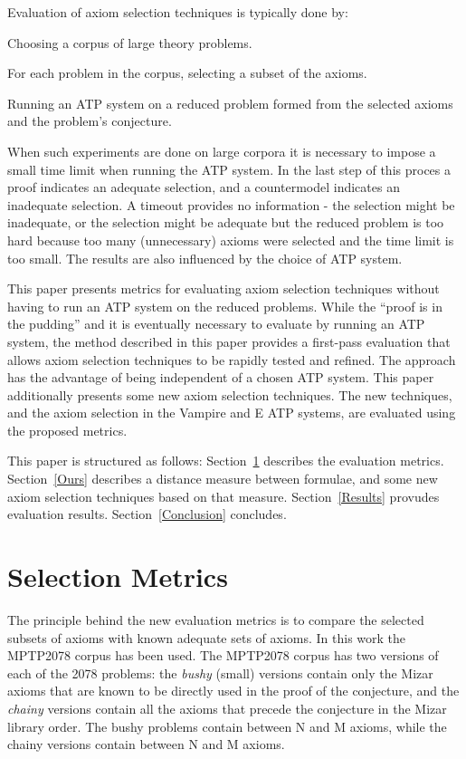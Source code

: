 \documentclass[EPiC]{easychair}
\newenvironment{packed_enumerate}{
\vspace*{-0.5em}
\begin{enumerate}
  \setlength{\partopsep}{0pt}
  \setlength{\itemsep}{1pt}
  \setlength{\parskip}{0pt}
  \setlength{\parsep}{0pt}
}{\end{enumerate}}
\begin{document}
Evaluation of axiom selection techniques is typically done by:
\begin{packed_enumerate}
\item Choosing a corpus of large theory problems.
\item For each problem in the corpus, selecting a subset of the axioms.
\item Running an ATP system on a reduced problem formed from the selected 
      axioms and the problem's conjecture.
\end{packed_enumerate}
When such experiments are done on large corpora it is necessary to impose
a small time limit when running the ATP system.
In the last step of this proces a proof indicates an adequate selection,
and a countermodel indicates an inadequate selection. 
A timeout provides no information - the selection might be inadequate, or
the selection might be adequate but the reduced problem is too hard because 
too many (unnecessary) axioms were selected and the time limit is too small.
The results are also influenced by the choice of ATP system.

This paper presents metrics for evaluating axiom selection techniques
without having to run an ATP system on the reduced problems.
While the ``proof is in the pudding'' and it is eventually necessary to
evaluate by running an ATP system, the method described in this paper
provides a first-pass evaluation that allows axiom selection techniques to
be rapidly tested and refined.
The approach has the advantage of being independent of a chosen ATP system.
This paper additionally presents some new axiom selection techniques. 
The new techniques, and the axiom selection in the Vampire \cite{KV13} 
and E \cite{SCV19} ATP systems, are evaluated using the proposed metrics.

This paper is structured as follows:
Section~\ref{Metrics} describes the evaluation metrics.
Section~\ref{Ours} describes a distance measure between formulae, and
some new axiom selection techniques based on that measure.
Section~\ref{Results} provudes evaluation results.
Section~\ref{Conclusion} concludes.

\section{Selection Metrics}
\label{Metrics}

The principle behind the new evaluation metrics is to compare the selected
subsets of axioms with known adequate sets of axioms.
In this work the MPTP2078 corpus has been used.
The MPTP2078 corpus has two versions of each of the 2078 problems: 
the \emph{bushy} (small) versions contain only the Mizar axioms that are
known to be directly used in the proof of the conjecture, and 
the \emph{chainy} versions contain all the axioms that precede the conjecture
in the Mizar library order.
The bushy problems contain between N and M axioms, while the chainy versions
contain between N and M axioms.
\end{document}

